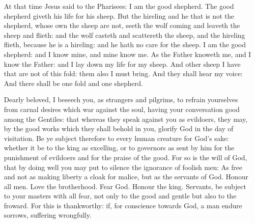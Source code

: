 \begin{multicols}{2}

At that time Jesus said to the Pharisees: I am the good shepherd. The good shepherd giveth his life for his sheep.  But
the hireling and he that is not the shepherd, whose own the sheep are not,
seeth the wolf coming and leaveth the sheep and flieth: and the wolf casteth
and scattereth the sheep, and the hireling flieth, because he is a hireling:
and he hath no care for the sheep.  I am the good shepherd: and I know mine,
and mine know me.  As the Father knoweth me, and I know the Father: and I lay
down my life for my sheep.  And other sheep I have that are not of this fold:
them also I must bring. And they shall hear my voice: And there shall be one
fold and one shepherd.


\bigskip




Dearly beloved, I beseech you, as strangers and pilgrims, to refrain yourselves
from carnal desires which war against the soul, having your conversation good
among the Gentiles: that whereas they speak against you as evildoers, they may,
by the good works which they shall behold in you, glorify God in the day of
visitation.  Be ye subject therefore to every human creature for God's sake:
whether it be to the king as excelling, or to governors as sent by him for the
punishment of evildoers and for the praise of the good.  For so is the will of
God, that by doing well you may put to silence the ignorance of foolish men: As
free and not as making liberty a cloak for malice, but as the servants of God.
Honour all men. Love the brotherhood. Fear God. Honour the king.  Servants, be
subject to your masters with all fear, not only to the good and gentle but also
to the froward.  For this is thankworthy: if, for conscience towards God, a man
endure sorrows, suffering wrongfully.




\end{multicols}
